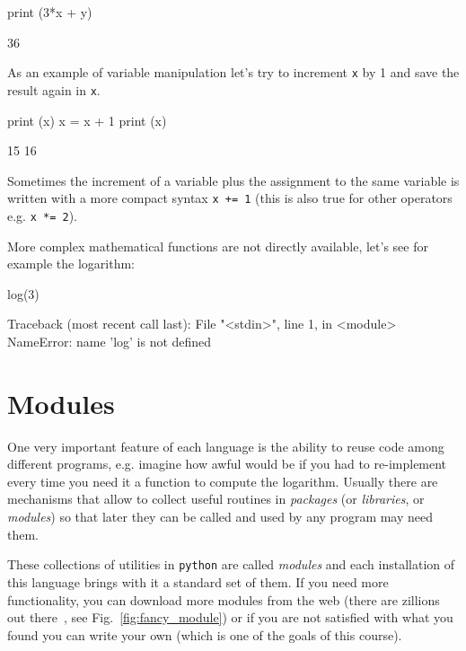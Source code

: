 \begin{ipython}
print (3*x + y)	
\end{ipython}
\begin{ioutput}
36	
\end{ioutput}

As an example of variable manipulation let's try to increment \texttt{x} by 1 and save the result again in \texttt{x}.

\begin{ipython}
print (x)
x = x + 1
print (x)	
\end{ipython}
\begin{ioutput}
15
16
\end{ioutput}

Sometimes the increment of a variable plus the assignment to the same variable is written 
with a more compact syntax \texttt{x += 1} (this is also true for other operators e.g. \texttt{x *= 2}).

More complex mathematical functions are not directly available, let's see for example the logarithm:

\begin{ipython}
log(3)
\end{ipython}
\begin{ioutput}
Traceback (most recent call last):
  File "<stdin>", line 1, in <module>
NameError: name 'log' is not defined
\end{ioutput}

\section{Modules}\label{modules}

One very important feature of each language is the ability to reuse code among 
different programs, e.g. imagine how awful would be if you had to re-implement every time 
you need it a function to compute the logarithm.
Usually there are mechanisms that allow to collect useful routines in \emph{packages} 
(or \emph{libraries}, or \emph{modules}) so that later they can be called and used by any 
program may need them.

These collections of utilities in \texttt{python} are called \emph{modules} and each installation 
of this language brings with it a standard set of them. If you need more functionality, you can 
download more modules from the web (there are zillions out there~\cite{modules}, see Fig.~\ref{fig:fancy_module})
or if you are 
not satisfied with what you found you can write your own (which is one of the goals of this course).

